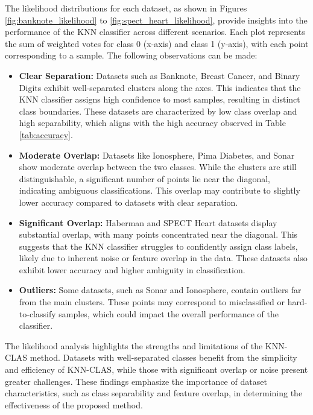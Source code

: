 \documentclass[conference]{IEEEtran}
\begin{document}
The likelihood distributions for each dataset, as shown in Figures \ref{fig:banknote_likelihood} to \ref{fig:spect_heart_likelihood}, provide insights into the performance of the KNN classifier across different scenarios. Each plot represents the sum of weighted votes for class 0 (x-axis) and class 1 (y-axis), with each point corresponding to a sample. The following observations can be made:

\begin{itemize}
    \item \textbf{Clear Separation:} Datasets such as Banknote, Breast Cancer, and Binary Digits exhibit well-separated clusters along the axes. This indicates that the KNN classifier assigns high confidence to most samples, resulting in distinct class boundaries. These datasets are characterized by low class overlap and high separability, which aligns with the high accuracy observed in Table \ref{tab:accuracy}.

    \item \textbf{Moderate Overlap:} Datasets like Ionosphere, Pima Diabetes, and Sonar show moderate overlap between the two classes. While the clusters are still distinguishable, a significant number of points lie near the diagonal, indicating ambiguous classifications. This overlap may contribute to slightly lower accuracy compared to datasets with clear separation.

    \item \textbf{Significant Overlap:} Haberman and SPECT Heart datasets display substantial overlap, with many points concentrated near the diagonal. This suggests that the KNN classifier struggles to confidently assign class labels, likely due to inherent noise or feature overlap in the data. These datasets also exhibit lower accuracy and higher ambiguity in classification.

    \item \textbf{Outliers:} Some datasets, such as Sonar and Ionosphere, contain outliers far from the main clusters. These points may correspond to misclassified or hard-to-classify samples, which could impact the overall performance of the classifier.

\end{itemize}

The likelihood analysis highlights the strengths and limitations of the KNN-CLAS method. Datasets with well-separated classes benefit from the simplicity and efficiency of KNN-CLAS, while those with significant overlap or noise present greater challenges. These findings emphasize the importance of dataset characteristics, such as class separability and feature overlap, in determining the effectiveness of the proposed method.
\end{document}
